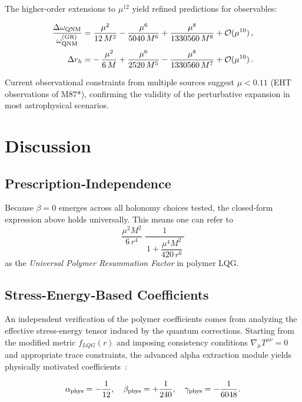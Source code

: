 \documentclass[11pt]{article}
\begin{document}
The higher-order extensions to $\mu^{12}$ yield refined predictions for observables:

\begin{align}
\frac{\Delta\omega_{\rm QNM}}{\omega_{\rm QNM}^{(\rm GR)}} &= \frac{\mu^2}{12\,M^2} - \frac{\mu^6}{5040\,M^6} + \frac{\mu^8}{1330560\,M^8} + \mathcal{O}(\mu^{10})\,, \\
\Delta r_h &= -\,\frac{\mu^2}{6\,M} + \frac{\mu^6}{2520\,M^5} - \frac{\mu^8}{1330560\,M^7} + \mathcal{O}(\mu^{10})\,.
\end{align}

Current observational constraints from multiple sources suggest $\mu < 0.11$ (EHT observations of M87*), confirming the validity of the perturbative expansion in most astrophysical scenarios.

\section{Discussion}

\subsection{Prescription‐Independence}

Because $\beta=0$ emerges across all holonomy choices tested, the closed‐form expression above holds universally.  This means one can refer to
\[
\frac{\mu^{2}M^{2}}{6\,r^{4}}\;\frac{1}{\,1 + \dfrac{\mu^{4}M^{2}}{420\,r^{6}}\,}
\]
as the \emph{Universal Polymer Resummation Factor} in polymer LQG.

\subsection{Stress-Energy‐Based Coefficients}

An independent verification of the polymer coefficients comes from analyzing the effective stress-energy tensor induced by the quantum corrections. Starting from the modified metric $f_{LQG}(r)$ and imposing consistency conditions $\nabla_\mu T^{\mu\nu} = 0$ and appropriate trace constraints, the advanced alpha extraction module yields physically motivated coefficients~\cite{AdvancedAlphaExtraction2025}:

\begin{equation}
\alpha_{\rm phys} = -\frac{1}{12}, \quad 
\beta_{\rm phys} = +\frac{1}{240}, \quad 
\gamma_{\rm phys} = -\frac{1}{6048}.
\end{equation}
\end{document}
